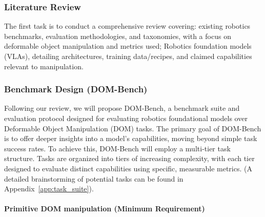 \subsubsection{Literature Review} %
The first task is to conduct a comprehensive review covering: existing robotics benchmarks, evaluation methodologies, and taxonomies, with a focus on deformable object manipulation and metrics used; Robotics foundation models (VLAs), detailing architectures, training data/recipes, and claimed capabilities relevant to manipulation.

\subsubsection{Benchmark Design (DOM-Bench)}
Following our review, we will propose DOM-Bench, a benchmark suite and evaluation protocol designed for evaluating robotics foundational models over Deformable Object Manipulation (DOM) tasks. The primary goal of DOM-Bench is to offer deeper insights into a model's capabilities, moving beyond simple task success rates.
To achieve this, DOM-Bench will employ a multi-tier task structure. Tasks are organized into tiers of increasing complexity, with each tier designed to evaluate distinct capabilities using specific, measurable metrics. (A detailed brainstorming of potential tasks can be found in Appendix~\ref{app:task_suite}).

\paragraph{\textbf{Primitive DOM manipulation} (Minimum Requirement)}

